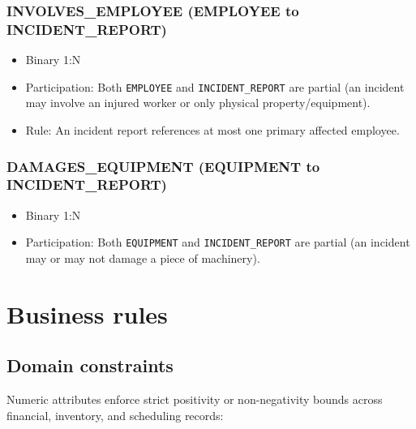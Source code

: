 \documentclass[a4paper,12pt]{report}
\providecommand{\tightlist}{%
  \setlength{\itemsep}{0pt}\setlength{\parskip}{0pt}}
\begin{document}
\subsection{\texorpdfstring{INVOLVES\texorpdfstring{\_\allowbreak{}}{_}EMPLOYEE (EMPLOYEE to INCIDENT\texorpdfstring{\_\allowbreak{}}{_}REPORT)}{INVOLVESEMPLOYEE (EMPLOYEE to INCIDENTREPORT)}}\label{involves_employee-employee-to-incident_report}

\begin{itemize}
\tightlist
\item
  Binary 1:N
\item
  Participation: Both \texttt{EMPLOYEE} and \texttt{INCIDENT\_\allowbreak{}REPORT} are partial (\allowbreak{}an incident may involve an injured worker or only physical property/equipment).
\item
  Rule: An incident report references at most one primary affected employee.
\end{itemize}

\subsection{\texorpdfstring{DAMAGES\texorpdfstring{\_\allowbreak{}}{_}EQUIPMENT (EQUIPMENT to INCIDENT\texorpdfstring{\_\allowbreak{}}{_}REPORT)}{DAMAGESEQUIPMENT (EQUIPMENT to INCIDENTREPORT)}}\label{damages_equipment-equipment-to-incident_report}

\begin{itemize}
\tightlist
\item
  Binary 1:N
\item
  Participation: Both \texttt{EQUIPMENT} and \texttt{INCIDENT\_\allowbreak{}REPORT} are partial (\allowbreak{}an incident may or may not damage a piece of machinery).
\end{itemize}

\chapter{Business rules}\label{business-rules}

\section{Domain constraints}\label{domain-constraints}

Numeric attributes enforce strict positivity or non-negativity bounds across financial, inventory, and scheduling records:
\end{document}
